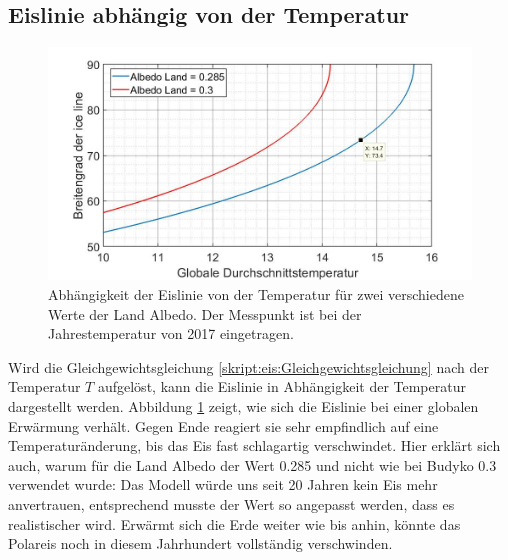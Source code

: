 \begin{refsection}
\subsection{Eislinie abhängig von der Temperatur}
\begin{figure}
	\centering
	\includegraphics[width=14cm]{eis/iceline_abh_von_der_Temperatur_mit_Verleich_albedo_0,3.jpg}
	\caption{Abhängigkeit der Eislinie von der Temperatur für zwei verschiedene Werte der Land Albedo. Der Messpunkt ist bei der Jahrestemperatur von 2017 eingetragen.}
	\label{skript:eis:fig:iceline_abh_von_der_Temperatur}
\end{figure}
Wird die Gleichgewichtsgleichung \eqref{skript:eis:Gleichgewichtsgleichung} nach der Temperatur $T$ aufgelöst, kann die Eislinie in Abhängigkeit der Temperatur dargestellt werden. Abbildung \ref{skript:eis:fig:iceline_abh_von_der_Temperatur} zeigt, wie sich die Eislinie bei einer globalen Erwärmung verhält. Gegen Ende reagiert sie sehr empfindlich auf eine Temperaturänderung, bis das Eis fast schlagartig verschwindet. Hier erklärt sich auch, warum für die Land Albedo der Wert 0.285 und nicht wie bei Budyko 0.3 verwendet wurde: Das Modell würde uns seit 20 Jahren kein Eis mehr anvertrauen, entsprechend musste der Wert so angepasst werden, dass es realistischer wird. Erwärmt sich die Erde weiter wie bis anhin, könnte das Polareis noch in diesem Jahrhundert vollständig verschwinden.

\end{refsection}
